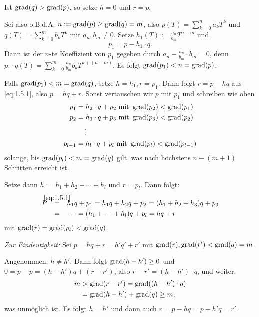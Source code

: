 \begin{beweis}
	Ist $\operatorname{grad}(q) > \operatorname{grad}(p)$, so setze $h=0$ und $r=p$.
	
	Sei also o.B.d.A. $n := \operatorname{grad}(p) \geq \operatorname{grad}(q) = m$, also $p(T) = \sum_{k=0}^{n} a_kT^{k}$ und $q(T) = \sum_{k=0}^{m} b_kT^{k}$ mit $a_n,b_m \neq 0$. Setze $h_1(T) := \frac{a_n}{b_m} T^{n-m}$ und
	\begin{equation}
		p_1 = p-h_1 \cdot q. \label{eq:1.5.1}
	\end{equation}
	Dann ist der $n$-te Koeffizient von $p_1$ gegeben durch $a_n - \frac{a_n}{b_m} \cdot b_m = 0$, denn $p_1 \cdot q(T) = \sum_{k=0}^{m} \frac{a_n}{b_m} b_k T^{k+(n-m)}$.
	Es folgt $\operatorname{grad}(p_1) < n = \operatorname{grad}(p)$.
	
	Falls $\operatorname{grad}(p_1) < m = \operatorname{grad}(q)$, setze $h = h_1, r= p_1$.
	Dann folgt $r = p-hq$ aus \eqref{eq:1.5.1}, also $p = hq+r$.
	Sonst vertauschen wir $p$ mit $p_1$ und schreiben wie oben
	\begin{align*}
		p_1 &= h_2 \cdot q + p_2 \text{ mit } \operatorname{grad}(p_2) < \operatorname{grad}(p_1) \\
		p_2 &= h_3 \cdot q + p_3 \text{ mit } \operatorname{grad}(p_3) < \operatorname{grad}(p_2) \\
		&\quad \vdots \\
		p_{l-1} &= h_l \cdot q + p_l \text{ mit } \operatorname{grad}(p_l) < \operatorname{grad}(p_{l-1})
	\end{align*}
	solange, bis $\operatorname{grad}(p_l) < m = \operatorname{grad}(q)$ gilt, was nach höchstens $n-(m+1)$ Schritten erreicht ist.
	
	Setze dann $h := h_1 + h_2 + \cdots + h_l$ und $r = p_l$.
	Dann folgt:
	\begin{align*}
		P &\stack{\eqref{eq:1.5.1}}{=} h_1 q + p_1 = h_1 q + h_2 q + p_2 =  (h_1+h_2+h_3)q + p_3 \\
		&\stack{}{=} \dots = (h_1 + \dots + h_l)q + p_l = hq + r
	\end{align*}
	mit $\operatorname{grad}(r) = \operatorname{grad}(p_l) < \operatorname{grad}(q)$.
	
	\textit{Zur Eindeutigkeit:} Sei $p = hq + r = h'q'+r'$ mit $\operatorname{grad}(r), \operatorname{grad}(r') < \operatorname{grad}(q) = m$.
	
	Angenommen, $h \neq h'$.
	Dann folgt $\operatorname{grad}(h-h') \geq 0$ und $0 = p-p = (h-h')q + (r-r')$, also $r-r' = (h-h') \cdot q$, und weiter:
	\begin{align*}
		m &> \operatorname{grad}(r-r') = \operatorname{grad}((h-h')\cdot q) \\
		&= \operatorname{grad}(h-h') + \operatorname{grad}(q) \geq m,
	\end{align*}
	was unmöglich ist.
	Es folgt $h = h'$ und dann auch $r = p-hq = p-h'q = r'$. \qedhere
\end{beweis}

